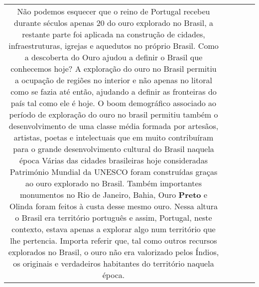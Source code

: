 \documentclass[11pt]{article}
\newlength\mylength
\begin{document}
\begin{center}
\begin{longtable}{|C{.65\mylength}|C{.30\mylength}|C{.12\mylength}|C{.12\mylength}|C{.12\mylength}|}
Não podemos esquecer que o reino de Portugal recebeu durante séculos apenas 20 do ouro explorado no Brasil, a restante parte foi aplicada na construção de cidades, infraestruturas, igrejas e aquedutos no próprio Brasil.  
Como a descoberta do Ouro ajudou a definir o Brasil que conhecemos hoje?
A exploração do ouro no Brasil permitiu a ocupação de regiões no interior e não apenas no litoral como se fazia até então, ajudando a definir as fronteiras do país tal como ele é hoje.  O boom demográfico associado ao período de exploração do ouro no brasil permitiu também o desenvolvimento de uma classe média formada por artesãos, artistas, poetas e intelectuais que em muito contribuíram para o grande desenvolvimento cultural do Brasil naquela época
Várias das cidades brasileiras hoje consideradas Património Mundial da UNESCO foram construídas graças ao ouro explorado no Brasil. Também importantes monumentos no Rio de Janeiro, Bahia, Ouro \textbf{Preto} e Olinda foram feitos à custa desse mesmo ouro. Nessa altura o Brasil era território português e assim, Portugal, neste contexto, estava apenas a explorar algo num território que lhe pertencia. Importa referir que, tal como outros recursos explorados no Brasil, o ouro não era valorizado pelos Índios, os originais e verdadeiros habitantes do território naquela época.


\end{longtable}
\end{center}
\end{document}
